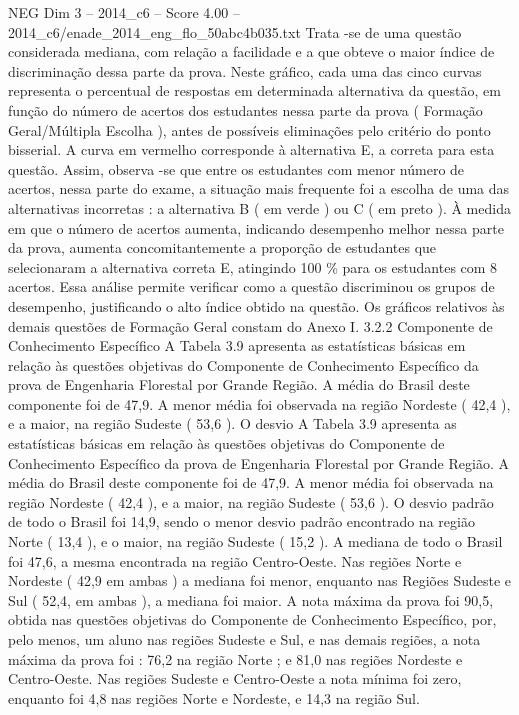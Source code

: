 \begin{textsample}{NEG Dim 3 – 2014\_c6 – Score 4.00 – 2014\_c6/enade\_2014\_eng\_flo\_50abc4b035.txt}
Trata -se de uma questão considerada mediana, com relação a facilidade e a que obteve o maior índice de discriminação dessa parte da prova.
Neste gráfico, cada uma das cinco curvas representa o percentual de respostas em determinada alternativa da questão, em função do número de acertos dos estudantes nessa parte da prova ( Formação Geral/Múltipla Escolha ), antes de possíveis eliminações pelo critério do ponto bisserial.
A curva em vermelho corresponde à alternativa E, a correta para esta questão.
Assim, observa -se que entre os estudantes com menor número de acertos, nessa parte do exame, a situação mais frequente foi a escolha de uma das alternativas incorretas : a alternativa B ( em verde ) ou C ( em preto ).
À medida em que o número de acertos aumenta, indicando desempenho melhor nessa parte da prova, aumenta concomitantemente a proporção de estudantes que selecionaram a alternativa correta E, atingindo 100 \% para os estudantes com 8 acertos.
Essa análise permite verificar como a questão discriminou os grupos de desempenho, justificando o alto índice obtido na questão.
Os gráficos relativos às demais questões de Formação Geral constam do Anexo I. 3.2.2 Componente de Conhecimento Específico A Tabela 3.9 apresenta as estatísticas básicas em relação às questões objetivas do Componente de Conhecimento Específico da prova de Engenharia Florestal por Grande Região.
A média do Brasil deste componente foi de 47,9.
A menor média foi observada na região Nordeste ( 42,4 ), e a maior, na região Sudeste ( 53,6 ).
O desvio A Tabela 3.9 apresenta as estatísticas básicas em relação às questões objetivas do Componente de Conhecimento Específico da prova de Engenharia Florestal por Grande Região.
A média do Brasil deste componente foi de 47,9.
A menor média foi observada na região Nordeste ( 42,4 ), e a maior, na região Sudeste ( 53,6 ).
O desvio padrão de todo o Brasil foi 14,9, sendo o menor desvio padrão encontrado na região Norte ( 13,4 ), e o maior, na região Sudeste ( 15,2 ).
A mediana de todo o Brasil foi 47,6, a mesma encontrada na região Centro-Oeste.
Nas regiões Norte e Nordeste ( 42,9 em ambas ) a mediana foi menor, enquanto nas Regiões Sudeste e Sul ( 52,4, em ambas ), a mediana foi maior.
A nota máxima da prova foi 90,5, obtida nas questões objetivas do Componente de Conhecimento Específico, por, pelo menos, um aluno nas regiões Sudeste e Sul, e nas demais regiões, a nota máxima da prova foi : 76,2 na região Norte ; e 81,0 nas regiões Nordeste e Centro-Oeste.
Nas regiões Sudeste e Centro-Oeste a nota mínima foi zero, enquanto foi 4,8 nas regiões Norte e Nordeste, e 14,3 na região Sul.

\end{textsample}
